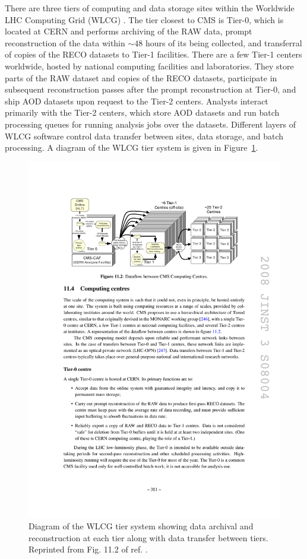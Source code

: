 \documentclass[dissertation.tex]{subfiles}
\begin{document}
There are three tiers of computing and data storage sites within the Worldwide LHC Computing Grid (WLCG) \cite{WLCG}.  The tier closest to CMS is Tier-0, which is located at CERN and performs archiving of the RAW data, prompt reconstruction of the data within $\sim48$ hours of its being collected, and transferral of copies of the RECO datasets to Tier-1 facilities.  There are a few Tier-1 centers worldwide, hosted by national computing facilities and laboratories.  They store parts of the RAW dataset and copies of the RECO datasets, participate in subsequent reconstruction passes after the prompt reconstruction at Tier-0, and ship AOD datasets upon request to the Tier-2 centers.  Analysts interact primarily with the Tier-2 centers, which store AOD datasets and run batch processing queues for running analysis jobs over the datasets.  Different layers of WLCG software control data transfer between sites, data storage, and batch processing.  A diagram of the WLCG tier system is given in Figure~\ref{fig:WLCG_diagram}.

\begin{figure}
	\centering
	\includegraphics[scale=1.0]{WLCG_diagram}
	\caption{Diagram of the WLCG tier system showing data archival and reconstruction at each tier along with data transfer between tiers.  Reprinted from Fig. 11.2 of ref. \cite{CMS_detector_paper}.}
	\label{fig:WLCG_diagram}
\end{figure}
\end{document}
